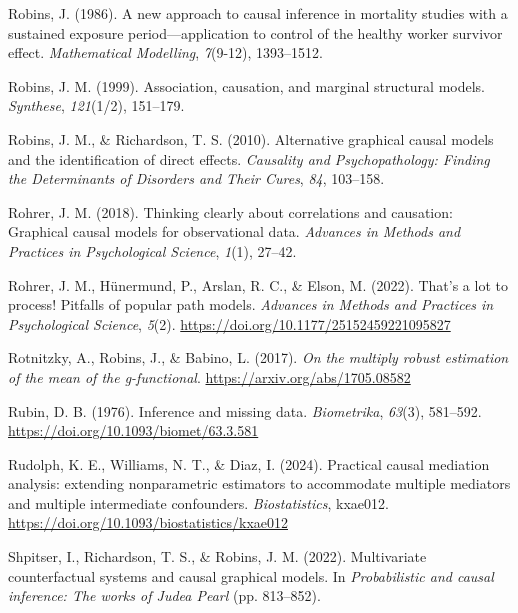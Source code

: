 \documentclass[
  single column]{article}
\newlength{\cslhangindent}
\newenvironment{CSLReferences}[2] %
 {\begin{list}{}{%
  \setlength{\itemindent}{0pt}
  \setlength{\leftmargin}{0pt}
  \setlength{\parsep}{0pt}
  \ifodd #1
   \setlength{\leftmargin}{\cslhangindent}
   \setlength{\itemindent}{-1\cslhangindent}
  \fi
  \setlength{\itemsep}{#2\baselineskip}}}
 {\end{list}}
\begin{document}
\begin{CSLReferences}{1}{0}
Robins, J. (1986). A new approach to causal inference in mortality
studies with a sustained exposure period---application to control of the
healthy worker survivor effect. \emph{Mathematical Modelling},
\emph{7}(9-12), 1393--1512.

Robins, J. M. (1999). Association, causation, and marginal structural
models. \emph{Synthese}, \emph{121}(1/2), 151--179.

Robins, J. M., \& Richardson, T. S. (2010). Alternative graphical causal
models and the identification of direct effects. \emph{Causality and
Psychopathology: Finding the Determinants of Disorders and Their Cures},
\emph{84}, 103--158.

Rohrer, J. M. (2018). Thinking clearly about correlations and causation:
Graphical causal models for observational data. \emph{Advances in
Methods and Practices in Psychological Science}, \emph{1}(1), 27--42.

Rohrer, J. M., Hünermund, P., Arslan, R. C., \& Elson, M. (2022). That's
a lot to process! Pitfalls of popular path models. \emph{Advances in
Methods and Practices in Psychological Science}, \emph{5}(2).
\url{https://doi.org/10.1177/25152459221095827}

Rotnitzky, A., Robins, J., \& Babino, L. (2017). \emph{On the multiply
robust estimation of the mean of the g-functional}.
\url{https://arxiv.org/abs/1705.08582}

Rubin, D. B. (1976). Inference and missing data. \emph{Biometrika},
\emph{63}(3), 581--592. \url{https://doi.org/10.1093/biomet/63.3.581}

Rudolph, K. E., Williams, N. T., \& Diaz, I. (2024). {Practical causal
mediation analysis: extending nonparametric estimators to accommodate
multiple mediators and multiple intermediate confounders}.
\emph{Biostatistics}, kxae012.
\url{https://doi.org/10.1093/biostatistics/kxae012}

Shpitser, I., Richardson, T. S., \& Robins, J. M. (2022). Multivariate
counterfactual systems and causal graphical models. In
\emph{Probabilistic and causal inference: The works of {J}udea {P}earl}
(pp. 813--852).


\end{CSLReferences}
\end{document}
